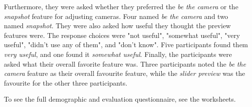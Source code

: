 Furthermore, they were asked whether they preferred the \textit{be the camera} or the \textit{snapshot} feature for adjusting cameras. Four named\textit{ be the camera} and two named \textit{snapshot}. 
They were also asked how useful they thought the preview features were. The response choices were "not useful", "somewhat useful", "very useful", "didn't use any of them", and "don't know". Five participants found them \textit{very useful}, and one found it \textit{somewhat useful}.
Finally, the participants were asked what their overall favorite feature was. Three participants noted the \textit{be the camera} feature as their overall favourite feature, while the \textit{slider preview} was the favourite for the other three participants. 

To see the full demographic and evaluation questionnaire, see the worksheets.



